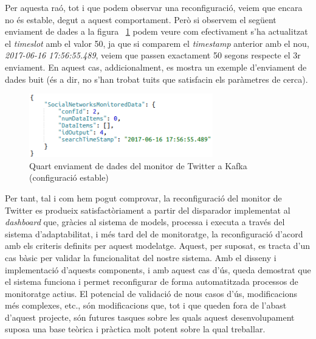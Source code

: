 Per aquesta raó, tot i que podem observar una reconfiguració, veiem que encara no és estable, degut a aquest comportament. Però si observem el següent enviament de dades a la figura ~\ref{fig:tfg4} podem veure com efectivament s'ha actualitzat el \textit{timeslot} amb el valor 50, ja que si comparem el \textit{timestamp} anterior amb el nou, \textit{2017-06-16 17:56:55.489}, veiem que passen exactament 50 segons respecte el 3r enviament. En aquest cas, addicionalment, es mostra un exemple d'enviament de dades buit (és a dir, no s'han trobat tuits que satisfacin els paràmetres de cerca). \\

\begin{figure}[H]
\centering
\includegraphics[width=8cm]{Figures/tfg4}
\decoRule
\caption{Quart enviament de dades del monitor de Twitter a Kafka (configuració estable)}
\label{fig:tfg4}
\end{figure} 

Per tant, tal i com hem pogut comprovar, la reconfiguració del monitor de Twitter es produeix satisfactòriament a partir del disparador implementat al \textit{dashboard} que, gràcies al sistema de models, processa i executa a través del sistema d'adaptabilitat, i més tard del de monitoratge, la reconfiguració d'acord amb els criteris definits per aquest modelatge. Aquest, per suposat, es tracta d'un cas bàsic per validar la funcionalitat del nostre sistema. Amb el disseny i implementació d'aquests components, i amb aquest cas d'ús, queda demostrat que el sistema funciona i permet reconfigurar de forma automatitzada processos de monitoratge actius. El potencial de validació de nous casos d'ús, modificacions més complexes, etc., són modificacions que, tot i que queden fora de l'abast d'aquest projecte, són futures tasques sobre les quals aquest desenvolupament suposa una base teòrica i pràctica molt potent sobre la qual treballar.